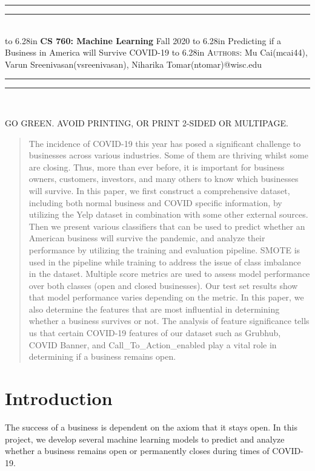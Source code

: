 \documentclass{article}
\newcommand{\lecture}[2]{
\pagestyle{myheadings}
\thispagestyle{plain}
\newpage
\noindent
\begin{center}
\rule{\textwidth}{1.6pt}\vspace*{-\baselineskip}\vspace*{2pt} %
\rule{\textwidth}{0.4pt}\\[1\baselineskip] %
\vbox{\vspace{2mm}
\hbox to 6.28in { {\bf CS 760: Machine Learning} \hfill Fall 2020 }
\vspace{4mm}
\hbox to 6.28in { {\Large \hfill #1  \hfill} }
\vspace{4mm}
\hbox to 6.28in { {\scshape Authors:}  #2 \hfill }}
\vspace{-2mm}
\rule{\textwidth}{0.4pt}\vspace*{-\baselineskip}\vspace{3.2pt} %
\rule{\textwidth}{1.6pt}\\[\baselineskip] %
\end{center}
\vspace*{4mm}
}
\begin{document}
\renewcommand{\baselinestretch}{0.75}\normalsize
\tableofcontents
\renewcommand{\baselinestretch}{1.0}\normalsize

\newcommand{\hytt}[1]{\texttt{\hyphenchar\font=\defaulthyphenchar #1}}


\lecture{Predicting if a Business in America will Survive COVID-19}{Mu Cai(mcai44), Varun Sreenivasan(vsreenivasan), Niharika Tomar(ntomar){@wisc.edu}}


\begin{center}
{\Large {\sf GO GREEN. AVOID PRINTING, OR PRINT 2-SIDED OR MULTIPAGE.}}
\end{center}
\begin{abstract}  


The incidence of COVID-19 this year has posed a significant challenge to businesses across various industries. Some of them are thriving whilst some are closing. Thus, more than ever before, it is important for business owners, customers, investors, and many others to know which businesses will survive. In this paper, we first construct a comprehensive dataset, including both normal business and COVID specific information, by utilizing the Yelp dataset in combination with some other external sources.
Then we present various classifiers that can be used to predict whether an American business will survive the pandemic, and analyze their performance by utilizing the training and evaluation pipeline. SMOTE is used in the pipeline while training to address the issue of class imbalance in the dataset. Multiple score metrics are used to assess model performance over both classes (open and closed businesses). Our test set results show that model performance varies depending on the metric. In this paper, we also determine the features that are most influential in determining whether a business survives or not. The analysis of feature significance tells us that certain COVID-19 features of our dataset such as Grubhub, COVID Banner, and Call\_To\_Action\_enabled play a vital role in determining if a business remains open. 


\end{abstract}

\section{Introduction}
The success of a business is dependent on the axiom that it stays open. In this project, we develop several machine learning models to predict and analyze whether a business remains open or permanently closes during times of COVID-19.
\end{document}
